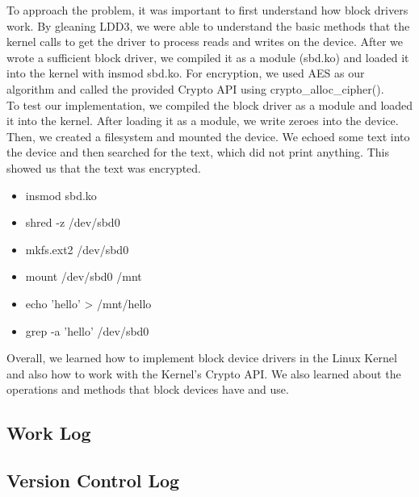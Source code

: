 \documentclass[journal, letterpaper, draftclsnofoot, onecolumn, 10pt]{IEEEtran}
\begin{document}
To approach the problem, it was important to first understand how block drivers work.
By gleaning LDD3, we were able to understand the basic methods that the kernel calls to get the driver to process reads and writes on the device.
After we wrote a sufficient block driver, we compiled it as a module (sbd.ko) and loaded it into the kernel with insmod sbd.ko.
For encryption, we used AES as our algorithm and called the provided Crypto API using crypto\_alloc\_cipher(). \\


To test our implementation, we compiled the block driver as a module and loaded it into the kernel.
After loading it as a module, we write zeroes into the device. Then, we created a filesystem and mounted the device.
We echoed some text into the device and then searched for the text, which did not print anything.
This showed us that the text was encrypted.

\begin{itemize}
    \item insmod sbd.ko
    \item shred -z /dev/sbd0
    \item mkfs.ext2 /dev/sbd0
    \item mount /dev/sbd0 /mnt
    \item echo 'hello' > /mnt/hello
    \item grep -a 'hello' /dev/sbd0
\end{itemize}



Overall, we learned how to implement block device drivers in the Linux Kernel and also how to work with the Kernel's Crypto API.
We also learned about the operations and methods that block devices have and use. \\


\subsection{Work Log}




\clearpage
\subsection{Version Control Log}



\FloatBarrier



\scalebox{0.8}{
}


\FloatBarrier
\end{document}
